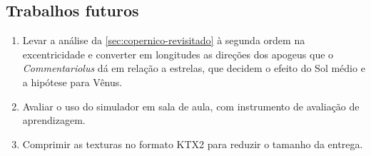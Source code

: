 \subsection{Trabalhos futuros}

\begin{enumerate}
  \item Levar a análise da \autoref{sec:copernico-revisitado} à segunda ordem na excentricidade e converter em longitudes as direções dos apogeus que o \emph{Commentariolus} dá em relação a estrelas, que decidem o efeito do Sol médio e a hipótese para Vênus.
  \item Avaliar o uso do simulador em sala de aula, com instrumento de avaliação de aprendizagem.
  \item Comprimir as texturas no formato KTX2 para reduzir o tamanho da entrega.
\end{enumerate}

